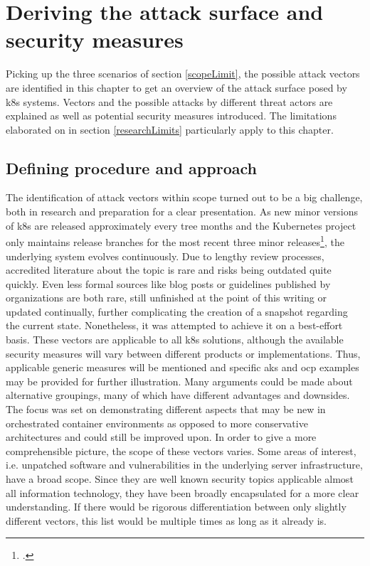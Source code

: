 \chapter{Deriving the attack surface and security measures} \label{deriveRisks}
\setcounter{footnote}{0}
\vspace{-0.25cm}

Picking up the three scenarios of section \ref{scopeLimit}, the possible attack vectors are  identified in this chapter to get an overview of the attack surface posed by \gls{k8s} systems. Vectors and the possible attacks by different threat actors are explained as well as potential security measures introduced. The limitations elaborated on in section \ref{researchLimits} particularly apply to this chapter.
\vspace{-0.25cm}
\section{Defining procedure and approach}
\vspace{-0.25cm}
The identification of attack vectors within scope turned out to be a big challenge, both in research and preparation for a clear presentation. 
As new minor versions of \gls{k8s} are released approximately every tree months and the Kubernetes project only maintains release branches for the most recent three minor releases\footcite[][, section 'Supported versions']{k8sSupport}, the underlying system evolves continuously. Due to lengthy review processes, accredited literature about the topic is rare and risks being outdated quite quickly. Even less formal sources like blog posts or guidelines published by organizations are both rare, still unfinished at the point of this writing or updated continually, further complicating the creation of a snapshot regarding the current state. Nonetheless, it was attempted to achieve it on a best-effort basis.
These vectors are applicable to all \gls{k8s} solutions, although the available security measures will vary between different products or implementations. Thus, applicable  generic measures will be mentioned and specific \gls{aks} and \gls{ocp} examples may be provided for further illustration.
Many arguments could be made about alternative groupings, many of which have different advantages and downsides. The focus was set on demonstrating different aspects that may  be new in orchestrated container environments as opposed to more conservative architectures and could still be improved upon.
In order to give a more comprehensible picture, the scope of these vectors varies. Some areas of interest, i.e. unpatched software and vulnerabilities in the underlying server  infrastructure, have a broad scope. Since they are well known security topics applicable almost all information technology, they have been broadly encapsulated for a more clear understanding. If there would be rigorous differentiation between only slightly different vectors, this list would be multiple times as long as it already is.

